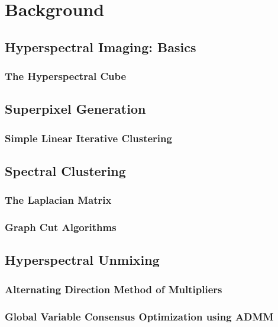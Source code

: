 \documentclass{article}
\begin{document}
\clearpage
% 
% 
% 
% 
% 
\section{Background}

\subsection{Hyperspectral Imaging: Basics}

\subsubsection{The Hyperspectral Cube}


\clearpage
\subsection{Superpixel Generation}
\subsubsection{Simple Linear Iterative Clustering}

\clearpage
\subsection{Spectral Clustering}
\subsubsection{The Laplacian Matrix}
\subsubsection{Graph Cut Algorithms}

\clearpage
\subsection{Hyperspectral Unmixing}
\subsubsection{Alternating Direction Method of Multipliers}
\subsubsection{Global Variable Consensus Optimization using ADMM}
\end{document}
